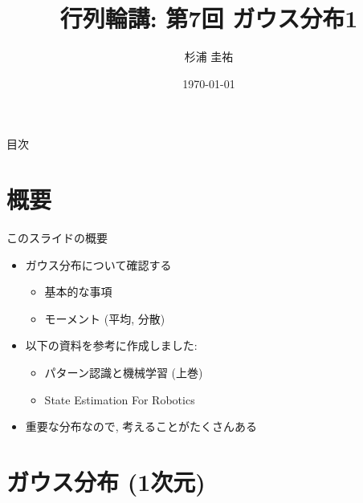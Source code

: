 \documentclass[dvipdfmx,notheorems,t]{beamer}
\title{行列輪講: 第7回 ガウス分布1}
\author{杉浦 圭祐}
\institute[松谷研究室]{慶應義塾大学理工学部情報工学科 松谷研究室}
\date{\today}
\begin{document}
\linespread{1.1}

\frame{\titlepage}

\section{}

\begin{frame}{目次}
\tableofcontents
\end{frame}

\section{概要}

\begin{frame}{このスライドの概要}
\begin{itemize}
  \item ガウス分布について確認する
  \begin{itemize}
    \item 基本的な事項
    \item モーメント (平均, 分散)
  \end{itemize}
  \item 以下の資料を参考に作成しました:
  \begin{itemize}
    \item パターン認識と機械学習 (上巻)
    \item State Estimation For Robotics
  \end{itemize}
  \item 重要な分布なので, 考えることがたくさんある
\end{itemize}
\end{frame}

\section{ガウス分布 (1次元)}
\end{document}
